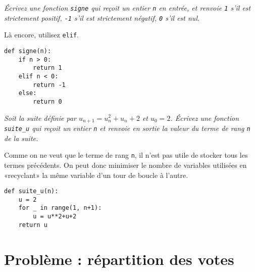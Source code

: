 \begin{Exercise}\it
Écrivez une fonction \lstinline|signe| qui reçoit un entier \lstinline|n| en entrée, et renvoie \lstinline|1| s'il est strictement positif, \lstinline|-1| s'il est strictement négatif, \lstinline|0| s'il est nul.
\end{Exercise}
\begin{Answer}Là encore, utilisez \lstinline|elif|.

\begin{lstlisting}
def signe(n):
    if n > 0:
        return 1
    elif n < 0:
        return -1
    else:
        return 0
\end{lstlisting}
\end{Answer}
\begin{Exercise}\it
Soit la suite définie par $u_{n+1}=u_n^2+u_n+2$ et $u_0=2$. Écrivez une fonction \lstinline|suite_u| qui reçoit un entier \lstinline|n| et renvoie en sortie la valeur du terme de rang \lstinline|n| de la suite.
\end{Exercise}
\begin{Answer}Comme on ne veut que le terme de rang \lstinline|n|, il n'est pas utile de stocker tous les termes précédents. On peut donc minimiser le nombre de variables utilisées en «recyclant» la même variable d'un tour de boucle à l'autre.

\begin{lstlisting}
def suite_u(n):
    u = 2
    for _ in range(1, n+1):
        u = u**2+u+2
    return u
\end{lstlisting}
\end{Answer}
\section{Problème : répartition des votes}
